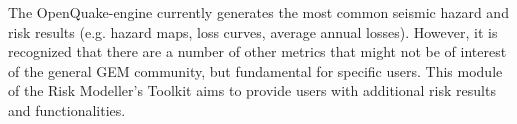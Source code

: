 The OpenQuake-engine currently generates the most common seismic hazard and risk results (e.g. hazard maps, loss curves, average annual losses). However, it is recognized that there are a number of other metrics that might not be of interest of the general GEM community, but fundamental for specific users. This module of the Risk Modeller's Toolkit aims to provide users with additional risk results and functionalities.